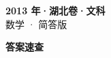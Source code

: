\documentclass[zihao=-4, a4paper]{ctexart}
\begin{document}
\begin{center}
  {\Large\bfseries 2013 年·湖北卷·文科}\\[4pt]
  {\large 数学 · 简答版}
\end{center}
\medskip
{}

\clearpage
{}
\begin{center}{\Large\bfseries 答案速查}\end{center}
\medskip

\end{document}

